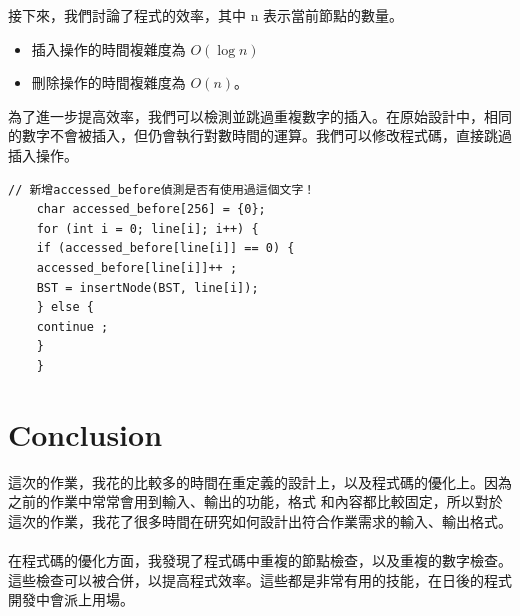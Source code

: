 \documentclass{article}
\begin{document}
	接下來，我們討論了程式的效率，其中 n 表示當前節點的數量。

	\begin{itemize}
		\item 插入操作的時間複雜度為 $O(\log n)$
		\item 刪除操作的時間複雜度為 $O(n)$。
	\end{itemize}

	為了進一步提高效率，我們可以檢測並跳過重複數字的插入。在原始設計中，相同的數字不會被插入，但仍會執行對數時間的運算。我們可以修改程式碼，直接跳過插入操作。

	\begin{lstlisting}[style=Cstyle]
	// 新增accessed_before偵測是否有使用過這個文字！
	char accessed_before[256] = {0};
	for (int i = 0; line[i]; i++) {
	if (accessed_before[line[i]] == 0) {
	accessed_before[line[i]]++ ;
	BST = insertNode(BST, line[i]);
	} else {
	continue ;
	}
	}
	\end{lstlisting}

	\section{Conclusion}
	這次的作業，我花的比較多的時間在重定義的設計上，以及程式碼的優化上。因為之前的作業中常常會用到輸入、輸出的功能，格式
	和內容都比較固定，所以對於這次的作業，我花了很多時間在研究如何設計出符合作業需求的輸入、輸出格式。
	\\\\
	在程式碼的優化方面，我發現了程式碼中重複的節點檢查，以及重複的數字檢查。這些檢查可以被合併，以提高程式效率。這些都是非常有用的技能，在日後的程式開發中會派上用場。
	
\end{document}
